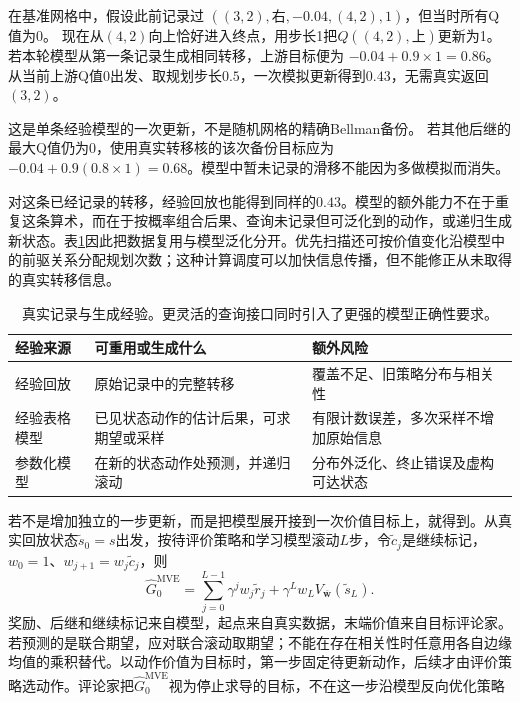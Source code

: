 \begin{example}[不返回上游也能传播一次奖励]
  \label{ex:rl-learning-dyna-grid}
  在基准网格中，假设此前记录过
  $((3,2),\text{右},-0.04,(4,2),1)$，但当时所有Q值为0。
  现在从$(4,2)$向上恰好进入终点，用步长1把$Q((4,2),\text{上})$更新为1。
  若本轮模型从第一条记录生成相同转移，上游目标便为
  $-0.04+0.9\times1=0.86$。从当前上游Q值0出发、取规划步长$0.5$，一次模拟更新得到$0.43$，无需真实返回$(3,2)$。

  这是单条经验模型的一次更新，不是随机网格的精确Bellman备份。
  若其他后继的最大Q值仍为0，使用真实转移核的该次备份目标应为
  $-0.04+0.9(0.8\times1)=0.68$。模型中暂未记录的滑移不能因为多做模拟而消失。
\end{example}

对这条已经记录的转移，经验回放也能得到同样的$0.43$。模型的额外能力不在于重复这条算术，而在于按概率组合后果、查询未记录但可泛化到的动作，或递归生成新状态。表\ref{tab:rl-learning-generated-experience}因此把数据复用与模型泛化分开。优先扫描还可按价值变化沿模型中的前驱关系分配规划次数；这种计算调度可以加快信息传播，但不能修正从未取得的真实转移信息。

\begin{table}[htbp]
  \centering
  \small
  \begin{tabularx}{\linewidth}{>{\raggedright\arraybackslash}p{21mm} >{\raggedright\arraybackslash}X >{\raggedright\arraybackslash}X}
    \toprule
    经验来源 & 可重用或生成什么 & 额外风险 \\
    \midrule
    经验回放 & 原始记录中的完整转移 & 覆盖不足、旧策略分布与相关性 \\
    经验表格模型 & 已见状态动作的估计后果，可求期望或采样 & 有限计数误差，多次采样不增加原始信息 \\
    参数化模型 & 在新的状态动作处预测，并递归滚动 & 分布外泛化、终止错误及虚构可达状态 \\
    \bottomrule
  \end{tabularx}
  \caption{真实记录与生成经验。更灵活的查询接口同时引入了更强的模型正确性要求。}
  \label{tab:rl-learning-generated-experience}
\end{table}

若不是增加独立的一步更新，而是把模型展开接到一次价值目标上，就得到。从真实回放状态$\widetilde s_0=s$出发，按待评价策略和学习模型滚动$L$步，令$\widetilde c_j$是继续标记，$w_0=1$、$w_{j+1}=w_j\widetilde c_j$，则
\begin{equation}
  \widehat G^{\mathrm{MVE}}_0
  =\sum_{j=0}^{L-1}\gamma^j w_j\widetilde r_j
    +\gamma^L w_L V_{\bar{\bm w}}(\widetilde s_L).
  \label{eq:rl-learning-mve}
\end{equation}
奖励、后继和继续标记来自模型，起点来自真实数据，末端价值来自目标评论家。若预测的是联合期望，应对联合滚动取期望；不能在存在相关性时任意用各自边缘均值的乘积替代。以动作价值为目标时，第一步固定待更新动作，后续才由评价策略选动作。评论家把$\widehat G^{\mathrm{MVE}}_0$视为停止求导的目标，不在这一步沿模型反向优化策略

